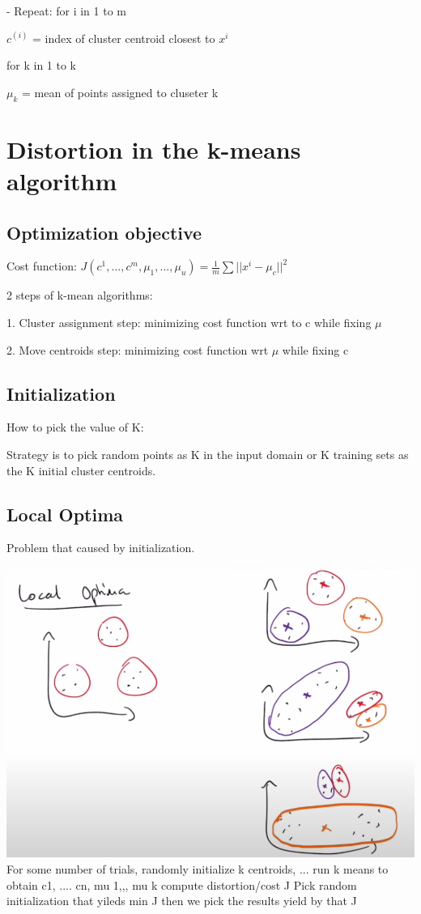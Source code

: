 \documentclass{article}
\begin{document}
- Repeat: 
    for i in 1 to m

    \hspace{1.1cm}$c^{(i)}$ = index of cluster centroid closest to $x^i$

    for k in 1 to k

    \hspace{1.1cm}$\mu_k$ = mean of points assigned to cluseter k


\section*{Distortion in the k-means algorithm}

\subsection*{Optimization objective }
Cost function: $J(c^1, ... , c^m, \mu_1, ..., \mu_u) = \frac{1}{m}\sum ||x^i -\mu_c||^2$

2 steps of k-mean algorithms:

1. Cluster assignment step: minimizing cost function wrt to c while fixing $\mu$

2. Move centroids step: minimizing cost function wrt $\mu$ while fixing c

\subsection*{Initialization}
How to pick the value of K:

                            
Strategy is to pick random points as K in the input domain or K training sets as the K initial cluster centroids. 

\subsection*{Local Optima}
Problem that caused by initialization. 

\includegraphics[width=0.7\linewidth]{W2V3.png}
For some number of trials, 
randomly initialize k centroids,  ... \muk
run k means to obtain c1, .... cn, mu 1,,, mu k
compute distortion/cost J
Pick random initialization that yileds min J
then we pick the results yield by that J
\end{document}
